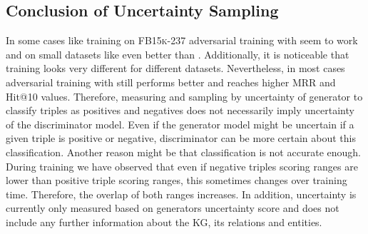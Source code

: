 \subsection{Conclusion of Uncertainty Sampling}
In some cases like training on \textsc{FB15k-237} adversarial training with \ussoftmax seem to work and on small datasets like \umls even better than \origsampling.
Additionally, it is noticeable that training looks very different for different datasets.
Nevertheless, in most cases adversarial training with \origsampling still performs better and reaches higher MRR and Hit@10 values.
Therefore, measuring and sampling by uncertainty of generator to classify triples as positives and negatives does not necessarily imply uncertainty of the discriminator model.
Even if the generator model might be uncertain if a given triple is positive or negative, discriminator can be more certain about this classification.
Another reason might be that classification is not accurate enough.
During training we have observed that even if negative triples scoring ranges are lower than positive triple scoring ranges, this sometimes changes over training time.
Therefore, the overlap of both ranges increases.
In addition, uncertainty is currently only measured based on generators uncertainty score and does not include any further information about the \ac{KG}, its relations and entities.


